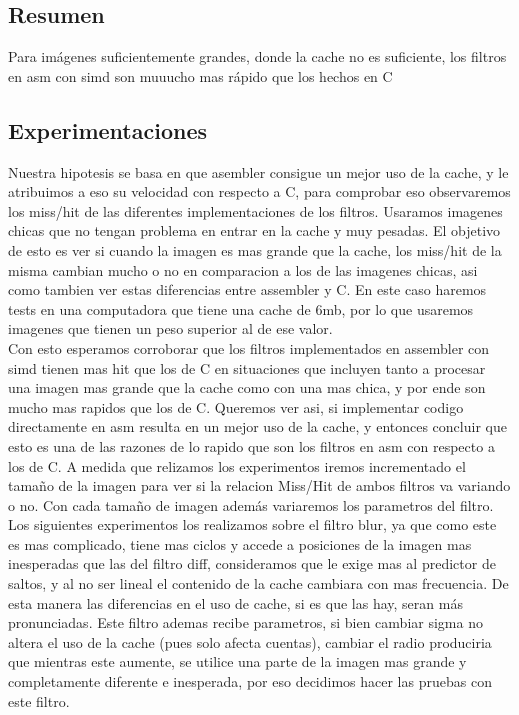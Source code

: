 \subsection{Resumen}

Para imágenes suficientemente grandes, donde la cache no es suficiente, los filtros en asm con simd son muuucho mas rápido que los hechos en C

\subsection{Experimentaciones}

Nuestra hipotesis se basa en que asembler consigue un mejor uso de la cache, y le atribuimos a eso su velocidad con respecto a C, para comprobar eso observaremos los miss/hit de las diferentes implementaciones de los filtros. Usaramos imagenes chicas que no tengan problema en entrar en la cache y muy pesadas. El objetivo de esto es ver si cuando la imagen es mas grande que la cache, los miss/hit de la misma cambian mucho o no en comparacion a los de las imagenes chicas, asi como tambien ver estas diferencias entre assembler y C. En este caso haremos tests en una computadora que tiene una cache de 6mb, por lo que usaremos imagenes que tienen un peso superior al de ese valor. \\


Con esto esperamos corroborar que los filtros implementados en assembler con simd tienen mas hit que los de C en situaciones que incluyen tanto a procesar una imagen mas grande que la cache como con una mas chica, y por ende son mucho mas rapidos que los de C. Queremos ver asi, si implementar codigo directamente en asm resulta en un mejor uso de la cache, y entonces concluir que esto es una de las razones de lo rapido que son los filtros en asm con respecto a los de C. A medida que relizamos los experimentos iremos incrementado el tamaño de la imagen para ver si la relacion Miss/Hit de ambos filtros va variando o no. Con cada tamaño de imagen además variaremos los parametros del filtro. \\


Los siguientes experimentos los realizamos sobre el filtro blur, ya que como este es mas complicado, tiene mas ciclos y accede a posiciones de la imagen mas inesperadas que las del filtro diff, consideramos que le exige mas al predictor de saltos, y al no ser lineal el contenido de la cache cambiara con mas frecuencia. De esta manera las diferencias en el uso de cache, si es que las hay, seran más pronunciadas. Este filtro ademas recibe parametros, si bien cambiar sigma no altera el uso de la cache (pues solo afecta cuentas), cambiar el radio produciria que mientras este aumente, se utilice una parte de la imagen mas grande y completamente diferente e inesperada, por eso decidimos hacer las pruebas con este filtro. \\


